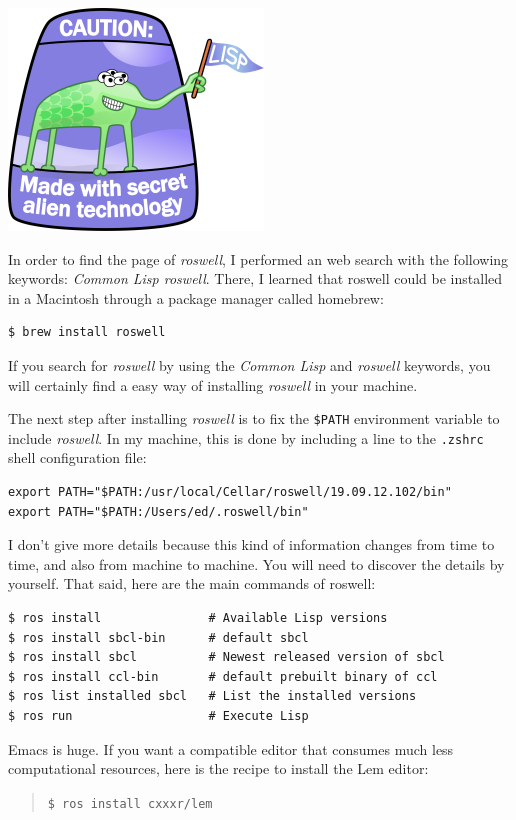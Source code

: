 \documentclass[a4paper,12pt]{book}
\begin{document}
\includegraphics{figs/lisplogo_fancy_256.png}

In order to find the page of {\em roswell}, I
performed an web search with the following
keywords: {\em Common Lisp roswell}. There, I
learned that roswell could be installed in
a Macintosh through a package manager called
homebrew:
\begin{verbatim}
$ brew install roswell
\end{verbatim}

If you search for {\em roswell} by using the
{\em Common Lisp} and {\em roswell} keywords,
you will certainly find a easy way of installing
{\em roswell} in your machine.

The next step after installing {\em roswell} is
to fix the \verb|$PATH| environment variable to
include {\em roswell}. In my machine, this is
done by including a line to the \verb|.zshrc|
shell configuration file:
\begin{verbatim}
export PATH="$PATH:/usr/local/Cellar/roswell/19.09.12.102/bin"
export PATH="$PATH:/Users/ed/.roswell/bin"
\end{verbatim}
I don't give more details because this kind of
information changes from time to time, and also
from machine to machine. You will need to
discover the details by yourself. That said,
here are the main commands of roswell:
\begin{verbatim}
$ ros install               # Available Lisp versions
$ ros install sbcl-bin      # default sbcl
$ ros install sbcl          # Newest released version of sbcl
$ ros install ccl-bin       # default prebuilt binary of ccl
$ ros list installed sbcl   # List the installed versions
$ ros run                   # Execute Lisp
\end{verbatim}

Emacs is huge. If you want a compatible editor
that consumes much less computational resources,
here is the recipe to install the Lem editor:
\begin{quote}
\verb|$ ros install cxxxr/lem|
\end{quote}
\end{document}
